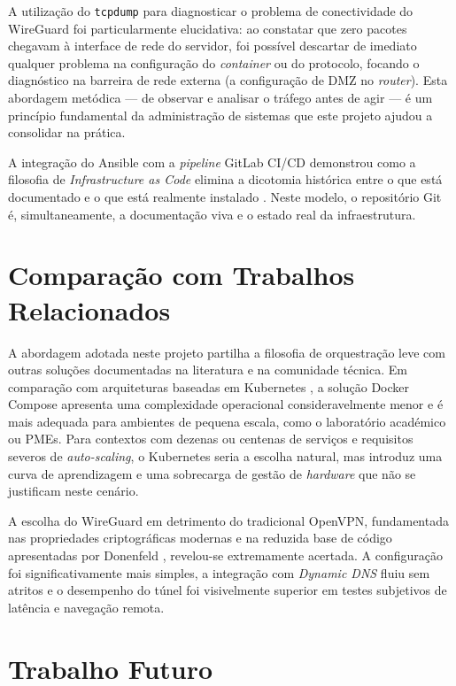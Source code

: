 A utilização do \texttt{tcpdump} para diagnosticar o problema de conectividade do WireGuard foi particularmente elucidativa: ao constatar que zero pacotes chegavam à interface de rede do servidor, foi possível descartar de imediato qualquer problema na configuração do \textit{container} ou do protocolo, focando o diagnóstico na barreira de rede externa (a configuração de DMZ no \textit{router}). Esta abordagem metódica --- de observar e analisar o tráfego antes de agir --- é um princípio fundamental da administração de sistemas que este projeto ajudou a consolidar na prática.

A integração do Ansible com a \textit{pipeline} GitLab CI/CD demonstrou como a filosofia de \textit{Infrastructure as Code} elimina a dicotomia histórica entre o que está documentado e o que está realmente instalado \cite{morris2016infrastructure}. Neste modelo, o repositório Git é, simultaneamente, a documentação viva e o estado real da infraestrutura.

\section{Comparação com Trabalhos Relacionados}

A abordagem adotada neste projeto partilha a filosofia de orquestração leve com outras soluções documentadas na literatura e na comunidade técnica. Em comparação com arquiteturas baseadas em Kubernetes \cite{docker_docs}, a solução Docker Compose apresenta uma complexidade operacional consideravelmente menor e é mais adequada para ambientes de pequena escala, como o laboratório académico ou PMEs. Para contextos com dezenas ou centenas de serviços e requisitos severos de \textit{auto-scaling}, o Kubernetes seria a escolha natural, mas introduz uma curva de aprendizagem e uma sobrecarga de gestão de \textit{hardware} que não se justificam neste cenário.

A escolha do WireGuard em detrimento do tradicional OpenVPN, fundamentada nas propriedades criptográficas modernas e na reduzida base de código apresentadas por Donenfeld \cite{donenfeld2017wireguard}, revelou-se extremamente acertada. A configuração foi significativamente mais simples, a integração com \textit{Dynamic DNS} fluiu sem atritos e o desempenho do túnel foi visivelmente superior em testes subjetivos de latência e navegação remota.

\section{Trabalho Futuro}

